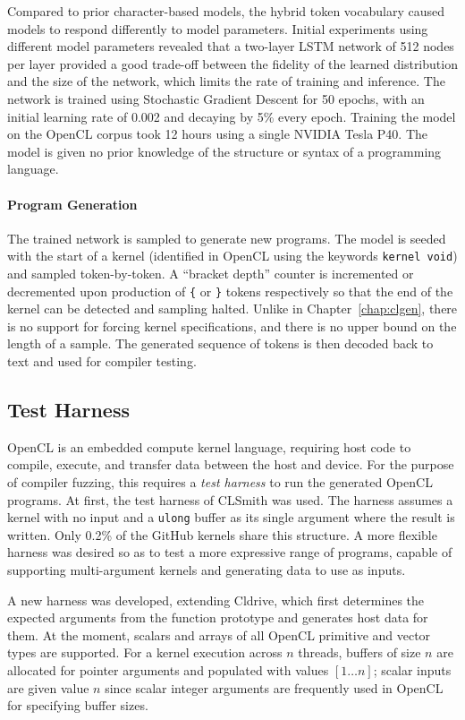 Compared to prior character-based models, the hybrid token vocabulary caused models to respond differently to model parameters. Initial experiments using different model parameters revealed that a two-layer LSTM network of 512 nodes per layer provided a good trade-off between the fidelity of the learned distribution and the size of the network, which limits the rate of training and inference. The network is trained using Stochastic Gradient Descent for 50 epochs, with an initial learning rate of 0.002 and decaying by 5\% every epoch. Training the model on the OpenCL corpus took 12 hours using a single NVIDIA Tesla P40. The model is given no prior knowledge of the structure or syntax of a programming language.

\paragraph*{Program Generation}

The trained network is sampled to generate new programs. The model is seeded with the start of a kernel (identified in OpenCL using the keywords \texttt{kernel void}) and sampled token-by-token. A ``bracket depth'' counter is incremented or decremented upon production of \texttt{\{} or \texttt{\}} tokens respectively so that the end of the kernel can be detected and sampling halted. Unlike in Chapter~\ref{chap:clgen}, there is no support for forcing kernel specifications, and there is no upper bound on the length of a sample. The generated sequence of tokens is then decoded back to text and used for compiler testing.


\subsection{Test Harness\label{sec:test-harness}}

OpenCL is an embedded compute kernel language, requiring host code to compile, execute, and transfer data between the host and device. For the purpose of compiler fuzzing, this requires a \emph{test harness} to run the generated OpenCL programs. At first, the test harness of CLSmith was used. The harness assumes a kernel with no input and a \texttt{ulong} buffer as its single argument where the result is written. Only 0.2\% of the GitHub kernels share this structure. A more flexible harness was desired so as to test a more expressive range of programs, capable of supporting multi-argument kernels and generating data to use as inputs.

A new harness was developed, extending Cldrive, which first determines the expected arguments from the function prototype and generates host data for them. At the moment, scalars and arrays of all OpenCL primitive and vector types are supported. For a kernel execution across $n$ threads, buffers of size $n$ are allocated for pointer arguments and populated with values {$[1 \ldots n]$}; scalar inputs are given value $n$ since scalar integer arguments are frequently used in OpenCL for specifying buffer sizes.

